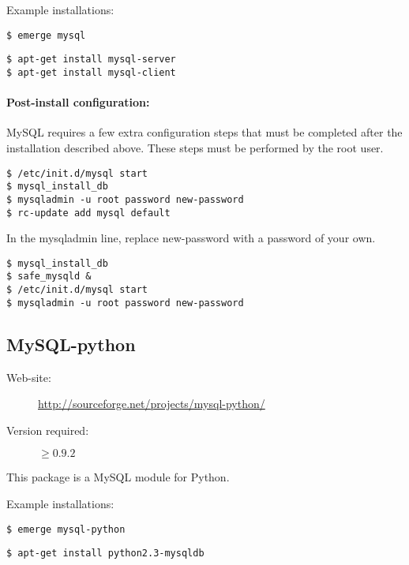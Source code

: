 Example installations:
\begin{lstlisting}[frame=trBL, caption=Installing MySQL on Gentoo GNU/Linux ,label=lst:instmysqlg]
$ emerge mysql
\end{lstlisting}
\begin{lstlisting}[frame=trBL, caption=Installing MySQL on Debian GNU/Linux ,label=lst:instmysqld]
$ apt-get install mysql-server
$ apt-get install mysql-client
\end{lstlisting}

\paragraph*{Post-install configuration:}
MySQL requires a few extra configuration steps that must be completed after the installation described above. These steps must be performed by the root user.
\begin{lstlisting}[frame=trBL, caption=Post-install configuration of mysql on Gentoo ,label=lst:mysqlconfg]
$ /etc/init.d/mysql start
$ mysql_install_db
$ mysqladmin -u root password new-password
$ rc-update add mysql default
\end{lstlisting}
In the mysqladmin line, replace new-password with a password of your own. 

\begin{lstlisting}[frame=trBL, caption=Post-install configuration of mysql on Debian ,label=lst:mysqlconfd]
$ mysql_install_db
$ safe_mysqld &
$ /etc/init.d/mysql start
$ mysqladmin -u root password new-password
\end{lstlisting}

\subsection{MySQL-python}
\begin{description}
\item[Web-site:] \url{http://sourceforge.net/projects/mysql-python/}
\item[Version required:] $\geq0.9.2$
\end{description}
This package is a MySQL module for Python.

Example installations:
\begin{lstlisting}[frame=trBL, caption=Installing MySQL-python on Gentoo GNU/Linux ,label=lst:instmysqlpyg]
$ emerge mysql-python
\end{lstlisting}
\begin{lstlisting}[frame=trBL, caption=Installing MySQL-python  on Debian GNU/Linux ,label=lst:instmysqlpyd]
$ apt-get install python2.3-mysqldb
\end{lstlisting}
